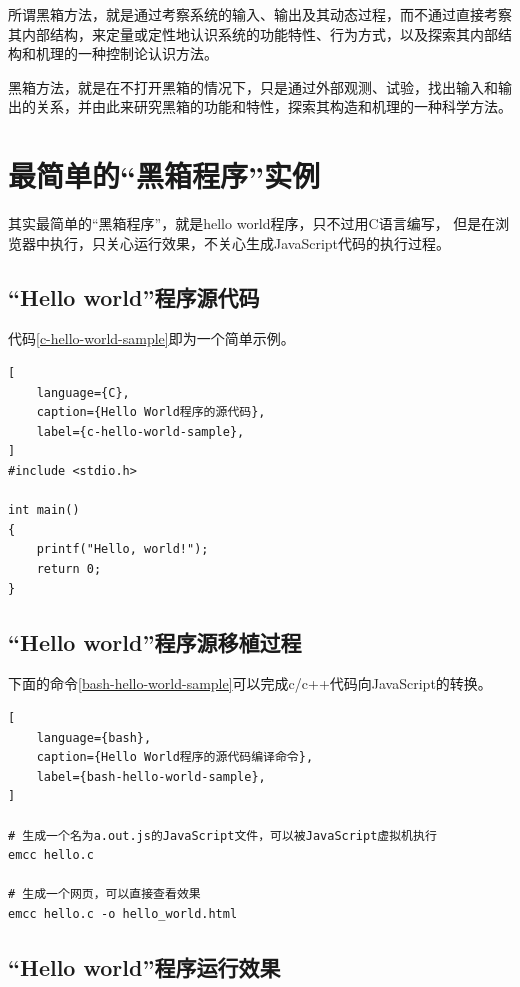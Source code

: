 所谓黑箱方法，就是通过考察系统的输入、输出及其动态过程，而不通过直接考察其内部结构，来定量或定性地认识系统的功能特性、行为方式，以及探索其内部结构和机理的一种控制论认识方法。

黑箱方法，就是在不打开黑箱的情况下，只是通过外部观测、试验，找出输入和输出的关系，并由此来研究黑箱的功能和特性，探索其构造和机理的一种科学方法。

\section{最简单的“黑箱程序”实例}

其实最简单的“黑箱程序”，就是hello world程序，只不过用C语言编写，
但是在浏览器中执行，只关心运行效果，不关心生成JavaScript代码的执行过程。

\subsection{“Hello world”程序源代码}

代码\ref{c-hello-world-sample}即为一个简单示例。

\begin{lstlisting}[
    language={C},
    caption={Hello World程序的源代码},
    label={c-hello-world-sample},
]
#include <stdio.h>

int main()
{
    printf("Hello, world!");
    return 0;
}
\end{lstlisting}

\subsection{“Hello world”程序源移植过程}

下面的命令\ref{bash-hello-world-sample}可以完成c/c++代码向JavaScript的转换。

\begin{lstlisting}[
    language={bash},
    caption={Hello World程序的源代码编译命令},
    label={bash-hello-world-sample},
]

# 生成一个名为a.out.js的JavaScript文件，可以被JavaScript虚拟机执行
emcc hello.c

# 生成一个网页，可以直接查看效果
emcc hello.c -o hello_world.html
\end{lstlisting}

\subsection{“Hello world”程序运行效果}

